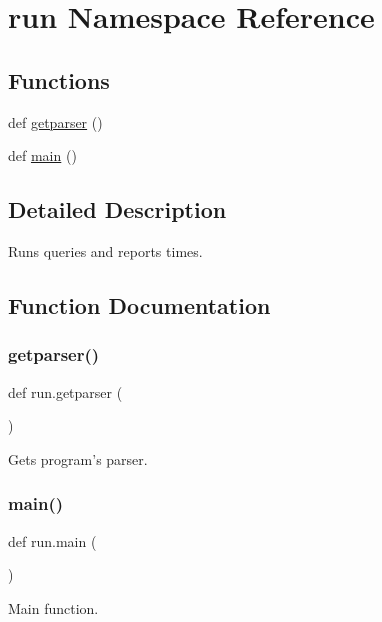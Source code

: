 \hypertarget{namespacerun}{}\section{run Namespace Reference}
\label{namespacerun}
\subsection*{Functions}
\begin{DoxyCompactItemize}
\item 
def \hyperlink{namespacerun_ab0850bd1de2556805c0de5c9070e05ef}{getparser} ()
\item 
def \hyperlink{namespacerun_a9c5af1e168e33914b2ff3996f6a22987}{main} ()
\end{DoxyCompactItemize}


\subsection{Detailed Description}
\begin{DoxyVerb}Runs queries and reports times.\end{DoxyVerb}
 

\subsection{Function Documentation}
\mbox{\label{namespacerun_ab0850bd1de2556805c0de5c9070e05ef}} 
\subsubsection{\texorpdfstring{getparser()}{getparser()}}
{\footnotesize\ttfamily def run.\+getparser (\begin{DoxyParamCaption}{ }\end{DoxyParamCaption})}

\begin{DoxyVerb}Gets program's parser.\end{DoxyVerb}
 \mbox{\label{namespacerun_a9c5af1e168e33914b2ff3996f6a22987}} 
\subsubsection{\texorpdfstring{main()}{main()}}
{\footnotesize\ttfamily def run.\+main (\begin{DoxyParamCaption}{ }\end{DoxyParamCaption})}

\begin{DoxyVerb}Main function.\end{DoxyVerb}
 